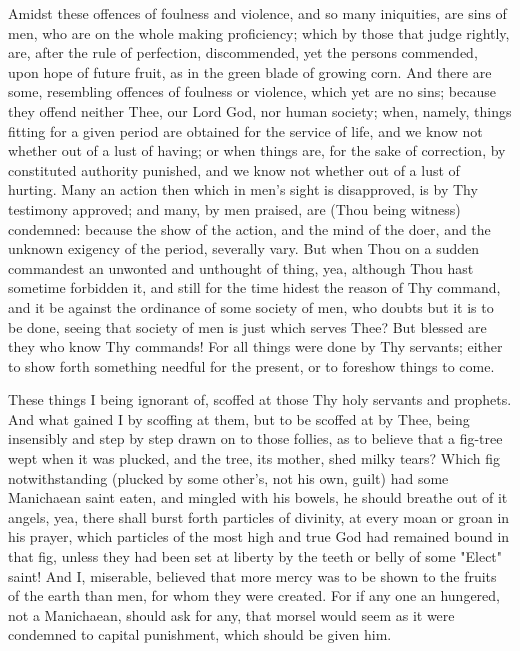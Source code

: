 \documentclass[b5paper,openright,12pt,twoside]{book}
\begin{document}
Amidst these offences of foulness and violence, and so many iniquities,
are sins of men, who are on the whole making proficiency; which by those
that judge rightly, are, after the rule of perfection, discommended, yet
the persons commended, upon hope of future fruit, as in the green blade
of growing corn. And there are some, resembling offences of foulness or
violence, which yet are no sins; because they offend neither Thee, our
Lord God, nor human society; when, namely, things fitting for a given
period are obtained for the service of life, and we know not whether out
of a lust of having; or when things are, for the sake of correction, by
constituted authority punished, and we know not whether out of a lust of
hurting. Many an action then which in men's sight is disapproved, is
by Thy testimony approved; and many, by men praised, are (Thou being
witness) condemned: because the show of the action, and the mind of the
doer, and the unknown exigency of the period, severally vary. But when
Thou on a sudden commandest an unwonted and unthought of thing, yea,
although Thou hast sometime forbidden it, and still for the time hidest
the reason of Thy command, and it be against the ordinance of some
society of men, who doubts but it is to be done, seeing that society
of men is just which serves Thee? But blessed are they who know Thy
commands! For all things were done by Thy servants; either to show forth
something needful for the present, or to foreshow things to come.

These things I being ignorant of, scoffed at those Thy holy servants and
prophets. And what gained I by scoffing at them, but to be scoffed at by
Thee, being insensibly and step by step drawn on to those follies, as
to believe that a fig-tree wept when it was plucked, and the tree, its
mother, shed milky tears? Which fig notwithstanding (plucked by some
other's, not his own, guilt) had some Manichaean saint eaten, and
mingled with his bowels, he should breathe out of it angels, yea, there
shall burst forth particles of divinity, at every moan or groan in his
prayer, which particles of the most high and true God had remained bound
in that fig, unless they had been set at liberty by the teeth or belly
of some "Elect" saint! And I, miserable, believed that more mercy was
to be shown to the fruits of the earth than men, for whom they were
created. For if any one an hungered, not a Manichaean, should ask for
any, that morsel would seem as it were condemned to capital punishment,
which should be given him.
\end{document}
